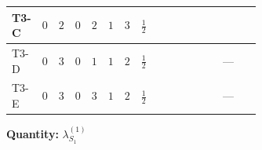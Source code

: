 \documentclass[8pt]{article}
\begin{document}
\begin{landscape}
\begin{longtable}{@{}llcccccc >{\raggedright\arraybackslash}p{0.21\linewidth} >{\raggedright\arraybackslash}p{0.21\linewidth} >{\raggedright\arraybackslash}p{0.21\linewidth}@{}}
T3-C & $0$ & $2$ & $0$ & $2$ & $1$ & $3$ & $\frac{1}{2}$ & \scriptsize\adjustbox{max width=\linewidth}{$\begin{gathered} +4 {\lambda_{HS_1}^{(1)}}^2\end{gathered}$} & \scriptsize\adjustbox{max width=\linewidth}{$\begin{gathered} +12 {\lambda_{S_1}^{(1)}}^2\end{gathered}$} & \scriptsize\adjustbox{max width=\linewidth}{$\begin{gathered} +\frac{9 {g_2}^4}{4}\end{gathered}$} \\
\midrule
T3-D & $0$ & $3$ & $0$ & $1$ & $1$ & $2$ & $\frac{1}{2}$ & \scriptsize\adjustbox{max width=\linewidth}{$\begin{gathered} +4 {\lambda_{HS_1}^{(1)}}^2\end{gathered}$} & \scriptsize\adjustbox{max width=\linewidth}{$\begin{gathered} +14 {\lambda_{S_1}^{(1)}}^2\end{gathered}$} & --- \\
\midrule
T3-E & $0$ & $3$ & $0$ & $3$ & $1$ & $2$ & $\frac{1}{2}$ & \scriptsize\adjustbox{max width=\linewidth}{$\begin{gathered} +4 {\lambda_{HS_1}^{(1)}}^2\end{gathered}$} & \scriptsize\adjustbox{max width=\linewidth}{$\begin{gathered} +14 {\lambda_{S_1}^{(1)}}^2\end{gathered}$} & --- \\
\midrule
\bottomrule
\end{longtable}
\clearpage
\noindent\textbf{Quantity: }$\lambda_{S_1}^{(1)}$\par\smallskip

\end{landscape}
\end{document}
